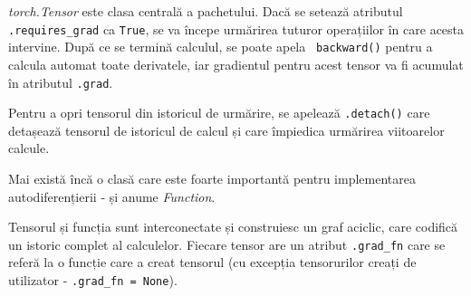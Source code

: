 \textit{torch.Tensor} este clasa centrală a pachetului. Dacă se setează atributul \texttt{.requires\_grad} ca  \texttt{True}, se va începe urmărirea tuturor operațiilor în care acesta intervine. După ce se termină calculul, se poate apela \texttt{ backward()} pentru a calcula automat toate derivatele, iar gradientul pentru acest tensor va fi acumulat în atributul \texttt{.grad}.

Pentru a opri tensorul din istoricul de urmărire, se apelează \texttt{.detach()} care detașează tensorul de istoricul de calcul și care împiedica urmărirea viitoarelor calcule.

Mai există încă o clasă care este foarte importantă pentru implementarea autodiferențierii - și anume \textit{Function}.

Tensorul și funcția sunt interconectate și construiesc un graf aciclic, care codifică un istoric complet al calculelor. Fiecare tensor are un atribut  \texttt{.grad\_fn} care se referă la o funcție care a creat tensorul (cu excepția tensorurilor creați de utilizator - \texttt{.grad\_fn = None}).